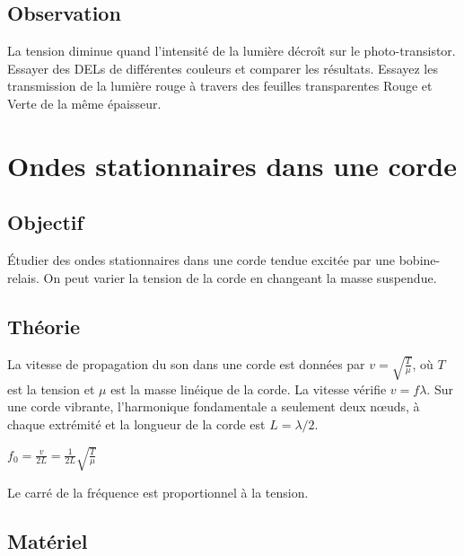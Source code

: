 \documentclass{book}
\begin{document}
\subsection{Observation}


La tension diminue quand l'intensité de la lumière décroît sur le photo-transistor. Essayer des DELs de différentes couleurs et comparer les résultats. Essayez les transmission de la lumière rouge à travers des feuilles transparentes Rouge et Verte de la même épaisseur.










\section{Ondes stationnaires dans une corde}



\subsection{Objectif}


Étudier des ondes stationnaires dans une corde tendue excitée par une bobine-relais. On peut varier la tension de la corde en changeant la masse suspendue.

\subsection{Théorie}


La vitesse de propagation du son dans une corde est données par
$v=\sqrt{\frac{T}{\mu} }$, où $T$ est la tension et $\mu$  est la masse linéique de la corde. La vitesse vérifie $v=f\lambda$. Sur une corde vibrante, l'harmonique fondamentale a seulement deux nœuds, à chaque extrémité et la longueur de la corde est $L=\lambda/2$.



$f_{0}=\frac{v}{2L}=\frac{1}{2L}\sqrt{\frac{T}{\mu} }$



Le carré de la fréquence est proportionnel à la tension.

\subsection{Matériel}
\end{document}
